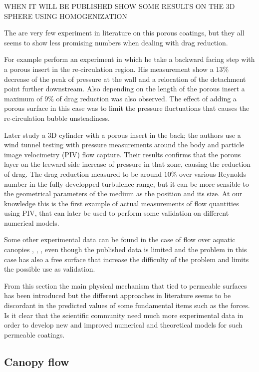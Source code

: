 WHEN IT WILL BE PUBLISHED SHOW SOME RESULTS ON THE 3D SPHERE USING HOMOGENIZATION \citet{zampogna2017new}

The are very few experiment in literature on this porous coatings, but they all seems to show less promising numbers when  dealing with drag reduction.

For example \citet{heenan1998passive} perform an experiment in which he take a backward facing step with a porous insert in the re-circulation region.
His measurement show a $13\%$ decrease of the peak of pressure at the wall and a relocation of the detachment point further downstream.
Also depending on the length of the porous insert a maximum of $9\%$ of drag reduction was also observed.
The effect of adding a porous surface in this case was to limit the pressure fluctuations that causes the re-circulation bubble unsteadiness.

Later \citet{klausmann2017drag} study a 3D cylinder with a porous insert in the back; the authors use a wind tunnel testing with pressure measurements around the body and particle image velocimetry (PIV) flow capture.
Their results confirms that the porous layer on the leeward side increase of pressure in that zone, causing the reduction of drag.
The drag reduction measured to be around $10\%$ over various Reynolds number in the fully developped turbulence range, but it can be more sensible to the geometrical parameters of the medium as the position and its size.
At our knowledge this is the first example of actual measurements of flow quantities using PIV, that can later be used to perform some validation on different numerical models.

Some other experimental data can be found in the case of flow over aquatic canopies \citet{zhang2011exchange}, \citet{segalini2011experimental}, \citet{hamed2017impact}, even though the published data is limited and the problem in this case has also a free surface that increase the difficulty of the problem and limits the possible use as validation.

From this section the main physical mechanism that tied to permeable surfaces has been introduced but the different approaches in literature seems to be discordant in the predicted values of some fundamental items such as the forces.
Is it clear that the scientific community need much more experimental data in order to develop new and improved numerical and theoretical models for such permeable coatings.

\subsection{Canopy flow}

